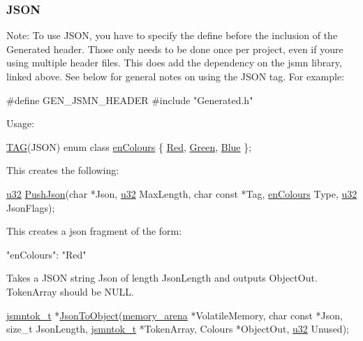 \subsubsection*{J\+S\+ON}

Note\+: To use J\+S\+ON, you have to specify the define before the inclusion of the Generated header. Those only needs to be done once per project, even if you\textquotesingle{}re using multiple header files. This does add the dependency on the jsmn library, linked above. See below for general notes on using the J\+S\+ON tag. For example\+:


\begin{DoxyCode}
\textcolor{preprocessor}{#define GEN\_JSMN\_HEADER}
\textcolor{preprocessor}{#include "Generated.h"}
\end{DoxyCode}


Usage\+: 
\begin{DoxyCode}
\hyperlink{Generated__001_8h_ad9b15e5b6d9b1ed55b76d9916ff6dec2}{TAG}(JSON)
\textcolor{keyword}{enum class} \hyperlink{PreprocTest_8h_a081cf1a0e70d6e2bd48c98f457742877}{enColours}
\{
    \hyperlink{PreprocTest_8h_a081cf1a0e70d6e2bd48c98f457742877aee38e4d5dd68c4e440825018d549cb47}{Red},
    \hyperlink{PreprocTest_8h_a081cf1a0e70d6e2bd48c98f457742877ad382816a3cbeed082c9e216e7392eed1}{Green},
    \hyperlink{PreprocTest_8h_a081cf1a0e70d6e2bd48c98f457742877a9594eec95be70e7b1710f730fdda33d9}{Blue}
\};
\end{DoxyCode}


This creates the following\+: 
\begin{DoxyCode}
\hyperlink{ab__common_8h_afaa62991928fb9fb18ff0db62a040aba}{u32}
\hyperlink{test_8h_a2e06da4f01d3cba9c9d2cf6687ed8bd5}{PushJson}(\textcolor{keywordtype}{char} *Json, \hyperlink{ab__common_8h_afaa62991928fb9fb18ff0db62a040aba}{u32} MaxLength, \textcolor{keywordtype}{char} \textcolor{keyword}{const} *Tag, \hyperlink{PreprocTest_8h_a081cf1a0e70d6e2bd48c98f457742877}{enColours} Type, 
      \hyperlink{ab__common_8h_afaa62991928fb9fb18ff0db62a040aba}{u32} JsonFlags);
\end{DoxyCode}
 This creates a json fragment of the form\+: 
\begin{DoxyCode}
"enColours": "Red"
\end{DoxyCode}


Takes a J\+S\+ON string {\ttfamily Json} of length {\ttfamily Json\+Length} and outputs {\ttfamily Object\+Out}. {\ttfamily Token\+Array} should be {\ttfamily N\+U\+LL}. 
\begin{DoxyCode}
\hyperlink{structjsmntok__t}{jsmntok\_t} *\hyperlink{test_8h_ae6d119cc4c994c6ce626578dc0fbfb7d}{JsonToObject}(\hyperlink{structmemory__arena}{memory\_arena} *VolatileMemory, \textcolor{keywordtype}{char} \textcolor{keyword}{const} *Json, \textcolor{keywordtype}{
      size\_t} JsonLength, \hyperlink{structjsmntok__t}{jsmntok\_t} *TokenArray, Colours *ObjectOut, \hyperlink{ab__common_8h_afaa62991928fb9fb18ff0db62a040aba}{u32} Unused);
\end{DoxyCode}


